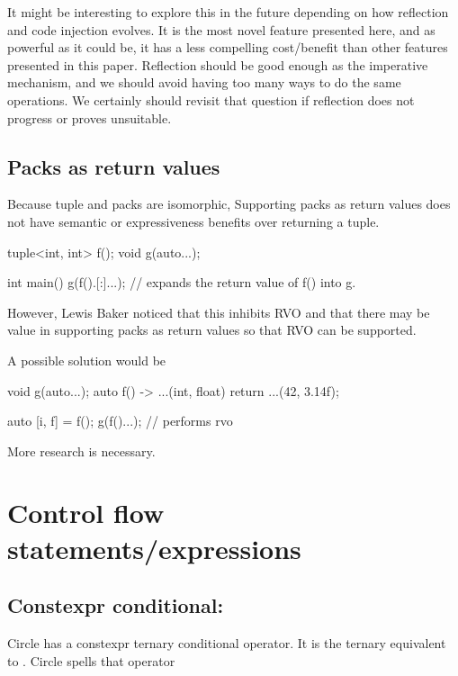 \documentclass{wg21}
\begin{document}
It might be interesting to explore this in the future depending on how reflection and code injection evolves.
It is the most novel feature presented here, and as powerful as it could be, it has a less compelling cost/benefit than other features presented in this paper.
Reflection should be good enough as the imperative mechanism, and we should avoid having too many ways to do the same operations.
We certainly should revisit that question if reflection does not progress or proves unsuitable.

\subsection{Packs as return values}

Because tuple and packs are isomorphic, Supporting packs as return values does not have semantic or expressiveness benefits over returning a tuple.

\begin{colorblock}
tuple<int, int> f();
void g(auto...);

int main() {
    g(f().[:]...); // expands the return value of f() into g.
}
\end{colorblock}

However, Lewis Baker noticed that this inhibits RVO and that there may be value in supporting packs as return values so that RVO can be supported.

A possible solution would be

\begin{colorblock}
void g(auto...);
auto f() -> ...(int, float) {
    return ...(42, 3.14f);
}

auto [i, f] = f();
g(f()...); // performs rvo
\end{colorblock}


More research is necessary.

\section{Control flow statements/expressions}

\subsection{Constexpr conditional: }

Circle has a constexpr ternary conditional operator.
It is the ternary equivalent to .
Circle spells that operator 
\end{document}
